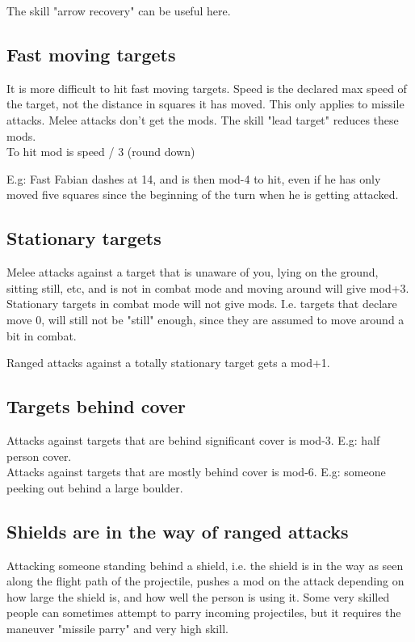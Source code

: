 The skill "arrow recovery" can be useful here.


\subsection*{Fast moving targets}
It is more difficult to hit fast moving targets. Speed is the declared max speed of the target, not the distance in squares it has moved. This only applies to missile attacks. Melee attacks don't get the mods. The skill "lead target" reduces these mods. \\
To hit mod is speed / 3 (round down)

E.g: Fast Fabian dashes at 14, and is then mod-4 to hit, even if he has only moved five squares since the beginning of the turn when he is getting attacked.


\subsection*{Stationary targets}
Melee attacks against a target that is unaware of you, lying on the ground, sitting still, etc, and is not in combat mode and moving around will give mod+3. Stationary targets in combat mode will not give mods. I.e. targets that declare move 0, will still not be "still" enough, since they are assumed to move around a bit in combat.

Ranged attacks against a totally stationary target gets a mod+1.


\subsection*{Targets behind cover}
Attacks against targets that are behind significant cover is mod-3. E.g: half person cover. \\
Attacks against targets that are mostly behind cover is mod-6. E.g: someone peeking out behind a large boulder.


\subsection*{Shields are in the way of ranged attacks}
Attacking someone standing behind a shield, i.e. the shield is in the way as seen along the flight path of the projectile, pushes a mod on the attack depending on how large the shield is, and how well the person is using it.
Some very skilled people can sometimes attempt to parry incoming projectiles, but it requires the maneuver "missile parry" and very high skill.


